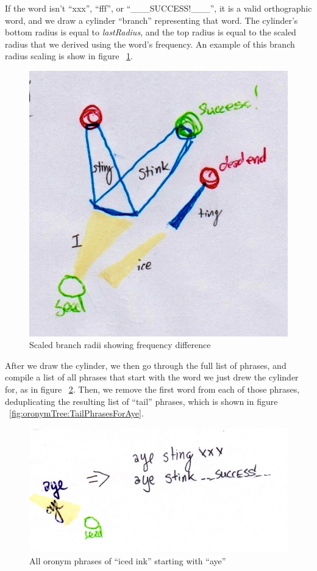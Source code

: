 If the word isn't ``xxx'', ``fff'', or ``\_\_\_SUCCESS!\_\_\_'', it is a valid orthographic word, and we draw a cylinder ``branch'' representing that word. The cylinder's bottom radius is equal to \emph{lastRadius}, and the top radius is equal to the scaled radius that we derived using the word's frequency.  An example of this branch radius scaling is show in figure ~\ref{fig:oronymTree:CylinderRadiusDiff}.

\begin{figure}[ht]
\begin{center}
\includegraphics[width=.33\textwidth]{Fig3_3_7_CylinderRadiusDiff.jpg}
\captionfonts
\caption[Branch radius scaling to show frequency differences]{Scaled branch radii showing frequency difference}
\label{fig:oronymTree:CylinderRadiusDiff}
\end{center}
\end{figure}

After we draw the cylinder, we then go through the full list of phrases, and compile a list of all phrases that start with the word we just drew the cylinder for, as in figure ~\ref{fig:oronymTree:PhrasesStartingWithAye}.  Then, we remove the first word from each of those phrases, deduplicating the resulting list of ``tail'' phrases, which is shown in figure ~\ref{fig:oronymTree:TailPhrasesForAye}.

\begin{figure}[ht]
\begin{center}
\includegraphics[width=.5\textwidth]{Fig3_3_8_PhrasesStartingWithAye.jpg}
\captionfonts
\caption[Oronym Phrases starting with aye]{All oronym phrases of ``iced ink'' starting with ``aye''}
\label{fig:oronymTree:PhrasesStartingWithAye}
\end{center}
\end{figure}

